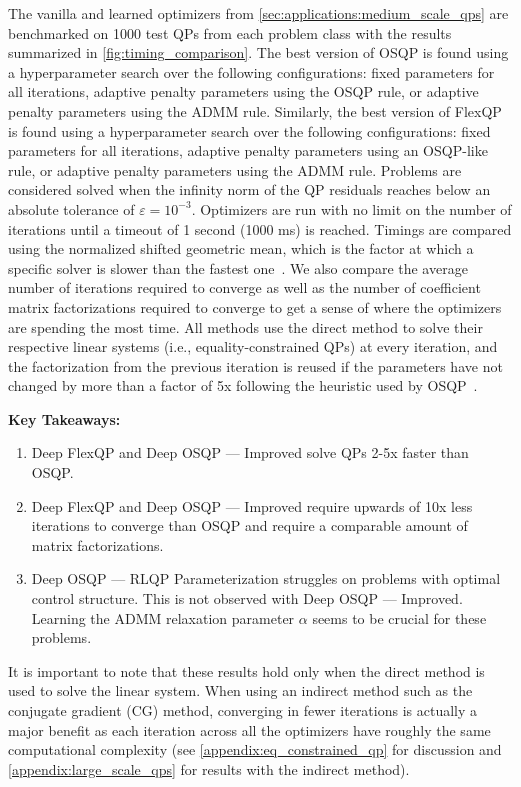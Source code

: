\documentclass{article} %
\begin{document}
The vanilla and learned optimizers from \cref{sec:applications:medium_scale_qps} are benchmarked on 1000 test QPs from each problem class with the results summarized in \cref{fig:timing_comparison}.
The best version of OSQP is found using a hyperparameter search over the following configurations: fixed parameters for all iterations, adaptive penalty parameters using the OSQP rule, or adaptive penalty parameters using the ADMM rule. Similarly, the best version of FlexQP is found using a hyperparameter search over the following configurations: fixed parameters for all iterations, adaptive penalty parameters using an OSQP-like rule, or adaptive penalty parameters using the ADMM rule.
Problems are considered solved when the infinity norm of the QP residuals reaches below an absolute tolerance of $\varepsilon = 10^{-3}$. Optimizers are run with no limit on the number of iterations until a timeout of 1 second (1000 ms) is reached. Timings are compared using the normalized shifted geometric mean, which is the factor at which a specific solver is slower than the fastest one~\citep{mittelmann2010benchmarks}. We also compare the average number of iterations required to converge as well as the number of coefficient matrix factorizations required to converge to get a sense of where the optimizers are spending the most time. All methods use the direct method to solve their respective linear systems (i.e., equality-constrained QPs) at every iteration, and the factorization from the previous iteration is reused if the parameters have not changed by more than a factor of 5x following the heuristic used by OSQP~\citep{stellato2020osqp}.

\textbf{Key Takeaways:}
\begin{enumerate}
    \item {\color{green}Deep FlexQP} and {\color{orange}Deep OSQP --- Improved} solve QPs 2-5x faster than {\color{blue}OSQP}.
    \item {\color{green}Deep FlexQP} and {\color{orange}Deep OSQP --- Improved} require upwards of 10x less iterations to converge than {\color{blue}OSQP} and require a comparable amount of matrix factorizations.
    \item {\color{red}Deep OSQP --- RLQP Parameterization} struggles on problems with optimal control structure. This is not observed with {\color{orange}Deep OSQP --- Improved}. Learning the ADMM relaxation parameter $\alpha$ seems to be crucial for these problems.
\end{enumerate}

It is important to note that these results hold only when the direct method is used to solve the linear system. When using an indirect method such as the conjugate gradient (CG) method, converging in fewer iterations is actually a major benefit as each iteration across all the optimizers have roughly the same computational complexity (see \cref{appendix:eq_constrained_qp} for discussion and \cref{appendix:large_scale_qps} for results with the indirect method).
\end{document}
